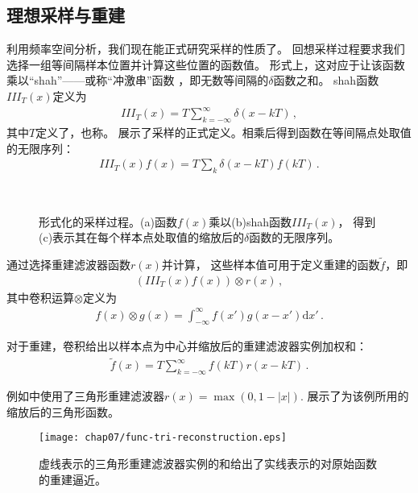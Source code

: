 \subsection{理想采样与重建}\label{sub:理想采样与重建}
利用频率空间分析，我们现在能正式研究采样的性质了。
回想采样过程要求我们选择一组等间隔样本位置并计算这些位置的函数值。
形式上，这对应于让该函数乘以“shah”——或称“冲激串”函数
，即无数等间隔的$\delta$函数之和。
shah函数$III_T(x)$定义为
\begin{align*}
    III_T(x)=T\sum\limits_{k=-\infty}^{\infty}\delta(x-kT)\, ,
\end{align*}
其中$T$定义了，也称。
展示了采样的正式定义。相乘后得到函数在等间隔点处取值的无限序列：
\begin{align*}
    III_T(x)f(x)=T\sum\limits_k\delta(x-kT)f(kT)\, .
\end{align*}
\begin{figure}[htbp]
    \centering
    \,
    \,
    \caption{形式化的采样过程。(a)函数$f(x)$乘以(b)shah函数$III_T(x)$，
        得到(c)表示其在每个样本点处取值的缩放后的$\delta$函数的无限序列。}
    \label{fig:7.4}
\end{figure}

通过选择重建滤波器函数$r(x)$并计算，
这些样本值可用于定义重建的函数$\tilde{f}$，即
\begin{align*}
    (III_T(x)f(x))\otimes r(x)\, ,
\end{align*}
其中卷积运算$\otimes$定义为
\begin{align*}
    f(x)\otimes g(x)=\int_{-\infty}^{\infty}f(x')g(x-x')\mathrm{d}x'\, .
\end{align*}

对于重建，卷积给出以样本点为中心并缩放后的重建滤波器实例加权和：
\begin{align*}
    \tilde{f}(x)=T\sum\limits_{k=-\infty}^{\infty}f(kT)r(x-kT)\, .
\end{align*}

例如中使用了三角形重建滤波器$r(x)=\max(0,1-|x|)$.
展示了为该例所用的缩放后的三角形函数。
\begin{figure}[htbp]
    \centering\texttt{[image: chap07/func-tri-reconstruction.eps]}
    \caption{虚线表示的三角形重建滤波器实例的和给出了实线表示的对原始函数的重建逼近。}
    \label{fig:7.5}
\end{figure}

